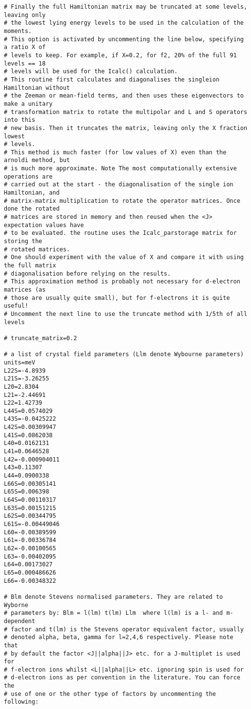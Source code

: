 {\begin{verbatim}
# Finally the full Hamiltonian matrix may be truncated at some levels, leaving only
# the lowest lying energy levels to be used in the calculation of the moments.
# This option is activated by uncommenting the line below, specifying a ratio X of
# levels to keep. For example, if X=0.2, for f2, 20% of the full 91 levels == 18
# levels will be used for the Icalc() calculation.
# This routine first calculates and diagonalises the singleion Hamiltonian without 
# the Zeeman or mean-field terms, and then uses these eigenvectors to make a unitary 
# transformation matrix to rotate the multipolar and L and S operators into this
# new basis. Then it truncates the matrix, leaving only the X fraction lowest 
# levels.
# This method is much faster (for low values of X) even than the arnoldi method, but
# is much more approximate. Note The most computationally extensive operations are 
# carried out at the start - the diagonalisation of the single ion Hamiltonian, and
# matrix-matrix multiplication to rotate the operator matrices. Once done the rotated 
# matrices are stored in memory and then reused when the <J> expectation values have 
# to be evaluated. the routine uses the Icalc_parstorage matrix for storing the 
# rotated matrices.
# One should experiment with the value of X and compare it with using the full matrix 
# diagonalisation before relying on the results. 
# This approximation method is probably not necessary for d-electron matrices (as 
# those are usually quite small), but for f-electrons it is quite useful!
# Uncomment the next line to use the truncate method with 1/5th of all levels

# truncate_matrix=0.2

# a list of crystal field parameters (Llm denote Wybourne parameters)
units=meV
L22S=-4.8939
L21S=-3.26255
L20=2.8304
L21=-2.44691
L22=1.42739
L44S=0.0574029
L43S=-0.0425222
L42S=0.00309947
L41S=0.0862038
L40=0.0162131
L41=0.0646528
L42=-0.000904011
L43=0.11307
L44=0.0900338
L66S=0.00305141
L65S=0.006398
L64S=0.00110317
L63S=0.00151215
L62S=0.00344795
L61S=-0.00449046
L60=-0.00389599
L61=-0.00336784
L62=-0.00100565
L63=-0.00402095
L64=0.00173027
L65=0.000486626
L66=-0.00348322

# Blm denote Stevens normalised parameters. They are related to Wyborne
# parameters by: Blm = l(lm) t(lm) Llm  where l(lm) is a l- and m-dependent
# factor and t(lm) is the Stevens operator equivalent factor, usually 
# denoted alpha, beta, gamma for l=2,4,6 respectively. Please note that
# by default the factor <J||alpha||J> etc. for a J-multiplet is used for
# f-electron ions whilst <L||alpha||L> etc. ignoring spin is used for 
# d-electron ions as per convention in the literature. You can force the
# use of one or the other type of factors by uncommenting the following:


\end{verbatim}}
